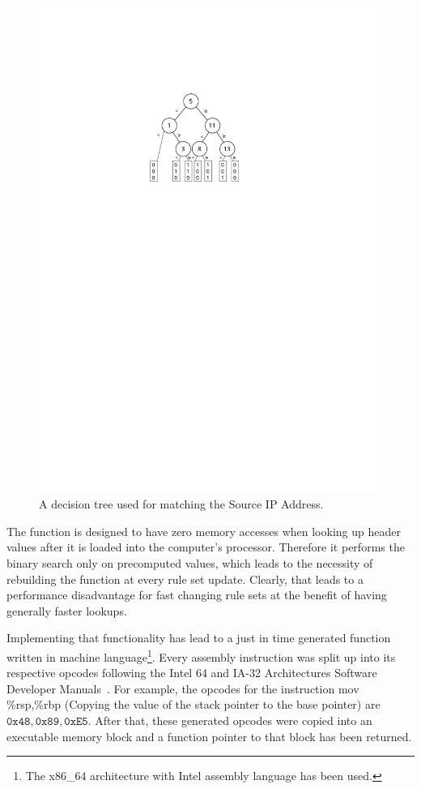 \documentclass[a4paper,
		12pt,
		parskip=full,
		titlepage
		]{scrartcl}
\begin{document}
\begin{figure}
\centering
\includegraphics[height=0.25\textheight]{images/bv-tree}
\caption{A decision tree used for matching the Source IP Address.}
\label{fig:bv-tree}
\end{figure}

The function is designed to have zero memory accesses when looking up header 
values after it is loaded into the computer's processor.
Therefore it performs the binary search only on precomputed values, which 
leads to the necessity of rebuilding the function at every rule set update.
Clearly, that leads to a performance disadvantage for fast changing rule sets at the benefit of having generally faster lookups.

Implementing that functionality has lead to a just in time generated function written in machine 
language\footnote{The x86\_64 architecture with Intel assembly language has been used.}.
Every assembly instruction was split up into its respective opcodes following the 
Intel 64 and IA-32 Architectures Software Developer Manuals~\cite{intelsys}.
For example, the opcodes for the instruction 
\textsf{mov \%rsp,\%rbp} (Copying the value of the stack pointer to the base pointer) 
are $\texttt{0x48}, \texttt{0x89}, \texttt{0xE5}$.
After that, these generated opcodes were copied into an executable memory block and a function pointer to that block has been returned.
\end{document}
